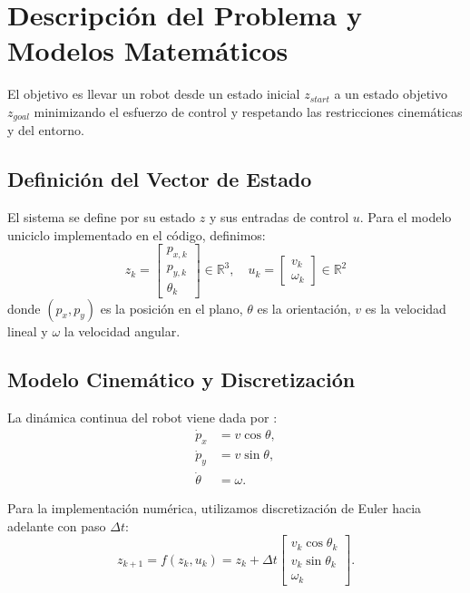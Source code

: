 \documentclass[conference]{IEEEtran}
\begin{document}
\section{Descripción del Problema y Modelos Matemáticos}

El objetivo es llevar un robot desde un estado inicial $z_{start}$ a un estado objetivo $z_{goal}$ minimizando el esfuerzo de control y respetando las restricciones cinemáticas y del entorno.

\subsection{Definición del Vector de Estado}
El sistema se define por su estado $z$ y sus entradas de control $u$. Para el modelo uniciclo implementado en el código, definimos:
\begin{equation}
    z_k = \begin{bmatrix} p_{x,k} \\ p_{y,k} \\ \theta_k \end{bmatrix} \in \mathbb{R}^3, \quad
    u_k = \begin{bmatrix} v_k \\ \omega_k \end{bmatrix} \in \mathbb{R}^2
\end{equation}
donde $(p_x, p_y)$ es la posición en el plano, $\theta$ es la orientación, $v$ es la velocidad lineal y $\omega$ la velocidad angular.

\subsection{Modelo Cinemático y Discretización}
La dinámica continua del robot viene dada por \cite{siegwart}:
\begin{align}
\dot p_x &= v \cos\theta, \\
\dot p_y &= v \sin\theta, \\
\dot\theta &= \omega.
\end{align}

Para la implementación numérica, utilizamos discretización de Euler hacia adelante con paso $\Delta t$:
\begin{equation}
z_{k+1} = f(z_k, u_k) = z_k + \Delta t \begin{bmatrix} v_k \cos\theta_k \\ v_k \sin\theta_k \\ \omega_k \end{bmatrix}.
\end{equation}
\end{document}

